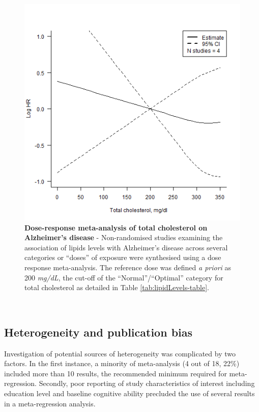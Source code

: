 \documentclass[a4paper, twoside]{templates/ociamthesis}
\begin{document}
\begin{figure}[H]

{\centering \includegraphics[width=0.7\linewidth]{figures/sys-rev/dr_AD_TC} 

}

\caption[Dose-response meta-analysis of total cholesterol on Alzheimer's disease]{\textbf{Dose-response meta-analysis of total cholesterol on Alzheimer's disease} - Non-randomised studies examining the association of lipids levels with Alzheimer's disease across several categories or ``doses'' of exposure were synthesised using a dose response meta-analysis. The reference dose was defined \emph{a priori} as 200 \emph{mg/dL}, the cut-off of the ``Normal''/``Optimal'' category for total cholesterol as detailed in Table \ref{tab:lipidLevels-table}.}\label{fig:lipidsDoseResponse}
\end{figure}

~

\hypertarget{heterogeneity-and-publication-bias}{%
\subsection{Heterogeneity and publication bias}\label{heterogeneity-and-publication-bias}}

Investigation of potential sources of heterogeneity was complicated by two factors. In the first instance, a minority of meta-analysis (4 out of 18, 22\%) included more than 10 results, the recommended minimum required for meta-regression. Secondly, poor reporting of study characteristics of interest including education level and baseline cognitive ability precluded the use of several results in a meta-regression analysis.
\end{document}
